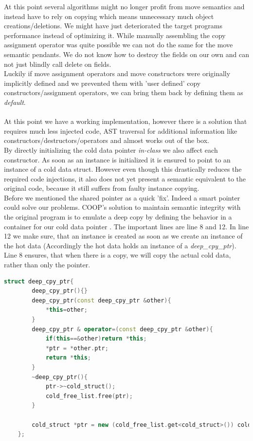 At this point several algorithms might no longer profit from move semantics and instead have to rely on copying which means unnecessary much object creations/deletions. We might have just deteriorated the target programs performance instead of optimizing it. While manually assembling the copy assignment operator was quite possible we can not do the same for the move semantic pendants. We do not know how to destroy the fields on our own and can not just blindly call delete on fields.\\
Luckily if move assignment operators and move constructors were originally implicitly defined and we prevented them with 'user defined' copy constructors/assignment operators, we can bring them back by defining them as \textit{default}.\\\\
At this point we have a working implementation, however there is a solution that requires much less injected code, AST traversal for additional information like constructors/destructors/operators and almost works out of the box.\\
By directly initializing the cold data pointer \textit{in-class} we also affect each constructor. As soon as an instance is initialized it is ensured to point to an instance of a cold data struct. However even though this drastically reduces the required code injections, it also does not yet present a semantic equivalent to the original code, because it still suffers from faulty instance copying.\\
Before we mentioned the shared pointer as a quick 'fix'. Indeed a smart pointer could solve our problems. COOP's solution to maintain semantic integrity with the original program is to emulate a deep copy by defining the behavior in a container for our cold data pointer . The important lines are line 8 and 12. In line 12 we make sure, that an instance is created as soon as we create an instance of the hot data (Accordingly the hot data holds an instance of a \textit{deep\_cpy\_ptr}). Line 8 ensures, that when there is a copy, we will copy the actual cold data, rather than only the pointer. 
\begin{lstlisting}[language=C++, name={Shortened version of COOP's container for the pointer to the cold data struct intance. It only defines a single field (the pointer) so no additional memory space is spend.}, label={deep_cpy_ptr}]
	struct deep_cpy_ptr{
		deep_cpy_ptr(){}
		deep_cpy_ptr(const deep_cpy_ptr &other){
			*this=other;
		}
		deep_cpy_ptr & operator=(const deep_cpy_ptr &other){
			if(this==&other)return *this;
			*ptr = *other.ptr;
			return *this;
		}
		~deep_cpy_ptr(){
			ptr->~cold_struct();
			cold_free_list.free(ptr);
		}
		
		cold_struct *ptr = new (cold_free_list.get<cold_struct>()) cold_struct();
	};
\end{lstlisting}
